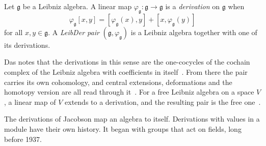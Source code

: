 \begin{definition}\label{def:origins:leibder}
Let $\mathfrak{g}$ be a Leibniz algebra. A linear map
$\varphi_{\mathfrak{g}}\colon \mathfrak{g} \to \mathfrak{g}$ is a
\emph{derivation} on $\mathfrak{g}$ when
\[
  \varphi_{\mathfrak{g}}[x, y] = [\varphi_{\mathfrak{g}}(x), y]
  + [x, \varphi_{\mathfrak{g}}(y)]
\]
for all $x, y \in \mathfrak{g}$. A \emph{LeibDer pair}
$(\mathfrak{g}, \varphi_{\mathfrak{g}})$ is a Leibniz algebra together with
one of its derivations.
\end{definition}

Das notes that the derivations in this sense are the one-cocycles of the
cochain complex of the Leibniz algebra with coefficients in
itself~\cite[\S 3, p.~4]{Das2021LeibDer}. From there the pair carries its own
cohomology, and central extensions, deformations and the homotopy version are
all read through it~\cite[p.~1]{Das2021LeibDer}. For a free Leibniz algebra on
a space $V$, a linear map of $V$ extends to a derivation, and the resulting
pair is the free one~\cite[Proposition~3.4, p.~5]{Das2021LeibDer}.

The derivations of Jacobson map an algebra to itself. Derivations with values
in a module have their own history. It began with groups that act on fields,
long before 1937.
